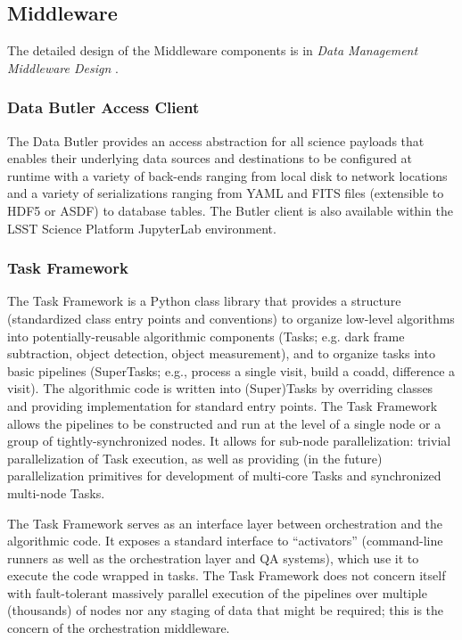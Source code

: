 \documentclass[DM,toc]{lsstdoc}
\begin{document}
\subsection{Middleware}\label{middleware}

The detailed design of the Middleware components is in \textit{Data Management Middleware Design} .

\subsubsection{Data Butler Access
Client}\label{data-butler-access-client}

The Data Butler provides an access abstraction for all science payloads
that enables their underlying data sources and destinations to be
configured at runtime with a variety of back-ends ranging from local
disk to network locations and a variety of serializations ranging from
YAML and FITS files (extensible to HDF5 or ASDF) to database tables. The
Butler client is also available within the LSST Science Platform
JupyterLab environment.

\subsubsection{Task Framework}\label{task-framework}

The Task Framework is a Python class library that provides a structure
(standardized class entry points and conventions) to organize low-level
algorithms into potentially-reusable algorithmic components (Tasks; e.g.
dark frame subtraction, object detection, object measurement), and to
organize tasks into basic pipelines (SuperTasks; e.g., process a single
visit, build a coadd, difference a visit). The algorithmic code is
written into (Super)Tasks by overriding classes and providing
implementation for standard entry points. The Task Framework allows the
pipelines to be constructed and run at the level of a single node or a
group of tightly-synchronized nodes. It allows for sub-node
parallelization: trivial parallelization of Task execution, as well as
providing (in the future) parallelization primitives for development of
multi-core Tasks and synchronized multi-node Tasks.

The Task Framework serves as an interface layer between orchestration
and the algorithmic code. It exposes a standard interface to
``activators'' (command-line runners as well as the orchestration layer
and QA systems), which use it to execute the code wrapped in tasks. The
Task Framework does not concern itself with fault-tolerant massively
parallel execution of the pipelines over multiple (thousands) of nodes
nor any staging of data that might be required; this is the concern of
the orchestration middleware.
\end{document}

